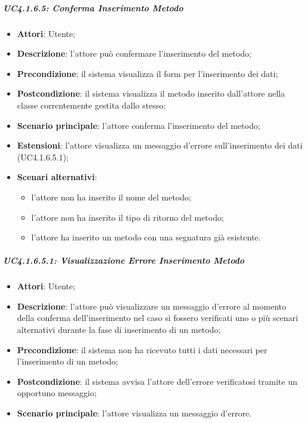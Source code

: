 \subparagraph{UC4.1.6.5: Conferma Inserimento Metodo}
\label{UC4.1.6.5}
\begin{itemize}
\item \textbf{Attori}: Utente;
\item \textbf{Descrizione}: l'attore può confermare l'inserimento del metodo;	
\item \textbf{Precondizione}: il sistema visualizza il form per l'inserimento dei dati;	
\item \textbf{Postcondizione}: il sistema visualizza il metodo inserito dall'attore nella classe correntemente gestita dallo stesso;	
\item \textbf{Scenario principale}:
l'attore conferma l'inserimento del metodo;	
\item \textbf{Estensioni}:
l'attore visualizza un messaggio d'errore sull'inserimento dei dati (UC4.1.6.5.1);	
\item \textbf{Scenari alternativi}:
\begin{itemize}
	\item l'attore non ha inserito il nome del metodo;
	\item l'attore non ha inserito il tipo di ritorno del metodo;
	\item l'attore ha inserito un metodo con una segnatura già esistente.
\end{itemize}
\end{itemize}












\subparagraph{UC4.1.6.5.1: Visualizzazione Errore Inserimento Metodo}
\label{UC4.1.6.5.1}
\begin{itemize}
\item \textbf{Attori}: Utente;
\item \textbf{Descrizione}: l'attore può visualizzare un messaggio d'errore al momento della conferma dell'inserimento nel caso si fossero verificati uno o più scenari alternativi durante la fase di inserimento di un metodo;	
\item \textbf{Precondizione}: il sistema non ha ricevuto tutti i dati necessari per l'inserimento di un metodo;	
\item \textbf{Postcondizione}: il sistema avvisa l'attore dell'errore verificatosi tramite un opportuno messaggio;	
\item \textbf{Scenario principale}:
l'attore visualizza un messaggio d'errore.	
\end{itemize}

